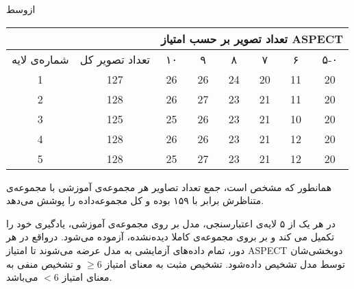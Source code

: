 ‌ازوسط

\begin{tabular}{cccccccc}
    \cline{3-8}
                                                               &                                        & \multicolumn{6}{c}{تعداد تصویر بر حسب امتیاز ASPECT}                                                                                                                                                                             \\ \hline
     
    {شماره‌ی لایه} & تعداد تصویر کل & {۱۰} & {۹} & {۸} & {۷} & {۶} & ۵-۰ \\ \hline
    {1}                                    & 127                                    & {26}                         & {26}                        & {24}                        & {20}                        & {11}                        & 20  \\
    {2}                                    & 128                                    & {26}                         & {27}                        & {23}                        & {21}                        & {11}                        & 20  \\ 
    {3}                                    & 125                                    & {25}                         & {26}                        & {23}                        & {21}                        & {10}                        & 20  \\ 
    {4}                                    & 128                                    & {26}                         & {26}                        & {23}                        & {21}                        & {12}                        & 20  \\ 
    {5}                                    & 128                                    & {25}                         & {27}                        & {23}                        & {21}                        & {12}                        & 20  \\ \hline
    \end{tabular}


همانطور که مشخص است، جمع تعداد تصاویر هر مجموعه‌ی آموزشی با مجموعه‌ی متناظرش برابر با ۱۵۹ بوده و کل مجموعه‌داده را پوشش می‌دهد.

در هر یک از ۵ لایه‌ی اعتبارسنجی، مدل بر روی مجموعه‌ی آموزشی، یادگیری خود را تکمیل می کند و بر بروی
 مجموعه‌ی کاملا دیده‌نشده، آزموده می‌شود.
 درواقع در هر دور، تمام داده‌های آزمایشی به مدل عرضه می‌شوند تا امتیاز ASPECT دو‌بخشی‌شان توسط مدل تشخیص داده‌شود.
تشخیص مثبت به معنای امتیاز $\geq 6$ و تشخیص منفی به معنای امتیاز $<6$ می‌باشد.\\

